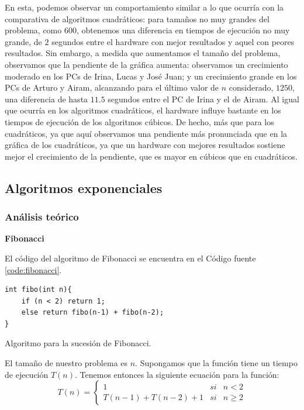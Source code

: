 \documentclass[12pt]{article}
\begin{document}
    En esta, podemos observar un comportamiento similar a lo que ocurría con la comparativa de algoritmos cuadráticos: para tamaños no muy grandes del problema, como $600$, obtenemos una diferencia en tiempos de ejecución no muy grande, de $2$ segundos entre el hardware con mejor resultados y aquel con peores resultados. Sin embargo, a medida que aumentamos el tamaño del problema, observamos que la pendiente de la gráfica aumenta: observamos un crecimiento moderado en los PCs de Irina, Lucas y José Juan; y un crecimiento grande en los PCs de Arturo y Airam, alcanzando para el último valor de $n$ considerado, $1250$, una diferencia de hasta $11.5$ segundos entre el PC de Irina y el de Airam. Al igual que ocurría en los algoritmos cuadráticos, el hardware influye bastante en los tiempos de ejecución de los algoritmos cúbicos. De hecho, más que para los cuadráticos, ya que aquí observamos una pendiente más pronunciada que en la gráfica de los cuadráticos, ya que un hardware con mejores resultados sostiene mejor el crecimiento de la pendiente, que es mayor en cúbicos que en cuadráticos. 
    
    \subsection{Algoritmos exponenciales}
    \subsubsection{Análisis teórico}
    \textbf{Fibonacci}
    
    El código del algoritmo de Fibonacci se encuentra en el Código fuente \ref{code:fibonacci}.
    
    \begin{listing}
        \begin{verbatim}
int fibo(int n){
    if (n < 2) return 1;
    else return fibo(n-1) + fibo(n-2);
}
        \end{verbatim}
        \caption{Algoritmo para la sucesión de Fibonacci.}
        \label{code:fibonacci}
    \end{listing}

    El tamaño de nuestro problema es $n$. Supongamos que la función tiene un tiempo de ejecución $T(n)$. Tenemos entonces la siguiente ecuación para la función:
    $$T(n) = \left\{\begin{array}{lcl}
        1 & si & n < 2 \\
        T(n-1) + T(n-2) + 1 & si & n \geq 2
    \end{array} \right.$$
\end{document}
